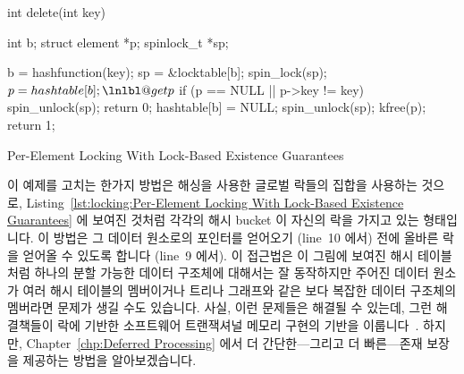 \begin{listing}[tbp]
\begin{linelabel}
\begin{VerbatimL}[commandchars=\\\@\$]
int delete(int key)
{
	int b;
	struct element *p;
	spinlock_t *sp;

	b = hashfunction(key);
	sp = &locktable[b];
	spin_lock(sp);				\lnlbl@acq$
	p = hashtable[b];			\lnlbl@getp$
	if (p == NULL || p->key != key) {
		spin_unlock(sp);
		return 0;
	}
	hashtable[b] = NULL;
	spin_unlock(sp);
	kfree(p);
	return 1;
}
\end{VerbatimL}
\end{linelabel}
\caption{Per-Element Locking With Lock-Based Existence Guarantees}
\label{lst:locking:Per-Element Locking With Lock-Based Existence Guarantees}
\end{listing}

이 예제를 고치는 한가지 방법은 해싱을 사용한 글로벌 락들의 집합을 사용하는
것으로,
Listing~\ref{lst:locking:Per-Element Locking With Lock-Based Existence Guarantees}
에 보여진 것처럼 각각의 해시 bucket 이 자신의 락을 가지고 있는 형태입니다.
이 방법은 그 데이터 원소로의 포인터를 얻어오기 (line~10 에서) 전에 올바른 락을
얻어올 수 있도록 합니다 (line~9 에서).
이 접근법은 이 그림에 보여진 해시 테이블처럼 하나의 분할 가능한 데이터 구조체에
대해서는 잘 동작하지만 주어진 데이터 원소가 여러 해시 테이블의 멤버이거나
트리나 그래프와 같은 보다 복잡한 데이터 구조체의 멤버라면 문제가 생길 수도
있습니다.
사실, 이런 문제들은 해결될 수 있는데, 그런 해결책들이 락에 기반한 소프트웨어
트랜잭셔널 메모리 구현의 기반을 이룹니다~\cite{Shavit95,DaveDice2006DISC}.
하지만, Chapter~\ref{chp:Deferred Processing} 에서 더 간단한---그리고 더
빠른---존재 보장을 제공하는 방법을 알아보겠습니다.
\iffalse

\begin{lineref}[ln:locking:Per-Element Locking With Lock-Based Existence Guarantees]
One way to fix this example is to use a hashed set of global locks, so
that each hash bucket has its own lock, as shown in
Listing~\ref{lst:locking:Per-Element Locking With Lock-Based Existence Guarantees}.
This approach allows acquiring the proper lock (on line~\lnref{acq}) before
gaining a pointer to the data element (on line~\lnref{getp}).
Although this approach works quite well for elements contained in a
single partitionable data structure such as the hash table shown in the
listing, it can be problematic if a given data element can be a member
of multiple hash tables or given more-complex data structures such
as trees or graphs.
Not only can these problems be solved, but the solutions also form
the basis of lock-based software transactional memory
implementations~\cite{Shavit95,DaveDice2006DISC}.
However,
Chapter~\ref{chp:Deferred Processing}
describes simpler---and faster---ways of providing existence guarantees.
\end{lineref}
\fi
